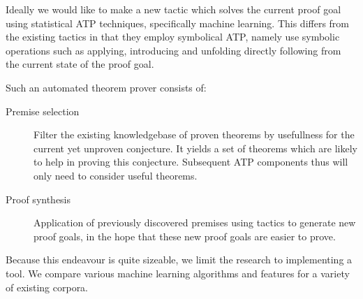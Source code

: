 Ideally we would like to make a new tactic which solves the current proof goal using statistical ATP techniques, specifically machine learning.
This differs from the existing tactics in that they employ symbolical ATP, namely use symbolic operations such as applying, introducing and unfolding
directly following from the current state of the proof goal. 


Such an automated theorem prover consists of:
\begin{description}
\item[Premise selection] Filter the existing knowledgebase of proven theorems by usefullness for the current yet unproven conjecture.
It yields a set of theorems which are likely to help in proving this conjecture.
Subsequent ATP components thus will only need to consider useful theorems. 
\item[Proof synthesis] Application of previously discovered premises using tactics to generate new proof goals,
in the hope that these new proof goals are easier to prove.
\end{description}

Because this endeavour is quite sizeable, we limit the research to implementing a \premiseselection tool.
We compare various machine learning algorithms and features for a variety of existing \coq corpora.

